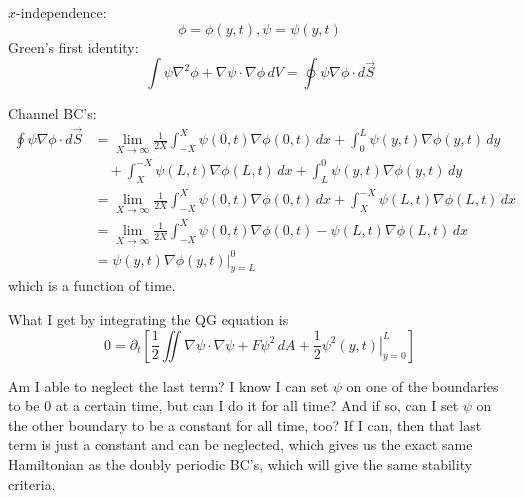 \documentclass[12pt]{article}
\begin{document}
$x$-independence:
$$
\phi = \phi(y, t), \psi = \psi(y, t)
$$
Green's first identity:
$$
\int \psi \nabla^2 \phi + \nabla \psi \cdot \nabla \phi \, dV = \oint \psi \nabla \phi \cdot d \vec S
$$

Channel BC's:
\begin{align*}
\oint \psi \nabla \phi \cdot d \vec S &= \lim_{X \rightarrow \infty} \frac{1}{2X} \int_{-X}^X \psi(0,t) \nabla \phi(0,t) \, dx + \int_0^L \psi(y,t) \nabla \phi(y,t) \, dy  \\
 &\quad + \int_X^{-X} \psi(L,t) \nabla \phi(L,t) \, dx + \int_L^0 \psi(y,t) \nabla \phi(y,t) \, dy \\
 &= \lim_{X \rightarrow \infty} \frac{1}{2X} \int_{-X}^X \psi(0,t) \nabla \phi(0,t) \, dx + \int_X^{-X} \psi(L,t) \nabla \phi(L,t) \, dx \\
 &= \lim_{X \rightarrow \infty} \frac{1}{2X} \int_{-X}^X \psi(0,t) \nabla \phi(0,t) - \psi(L,t) \nabla \phi(L,t) \, dx \\
 &= \left. \psi(y,t) \nabla \phi(y,t) \right|_{y=L}^0
\end{align*}
which is a function of time.

What I get by integrating the QG equation is 
$$
0= \partial_t \left[ \frac12 \iint \nabla\psi\cdot\nabla\psi + F\psi^2 \, dA + \frac12 \left. \psi^2(y,t) \right|_{y=0}^L \right]
$$

Am I able to neglect the last term? I know I can set $\psi$ on one of the boundaries to be 0 at a certain time, but can I do it for all time? And if so, can I set $\psi$ on the other boundary to be a constant for all time, too? If I can, then that last term is just a constant and can be neglected, which gives us the exact same Hamiltonian as the doubly periodic BC's, which will give the same stability criteria.
\end{document}
